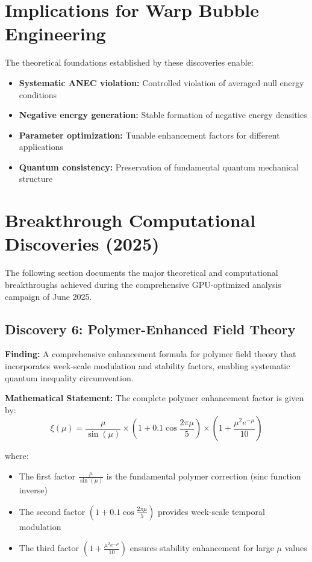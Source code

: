 \documentclass[11pt]{article}
\begin{document}
\section{Implications for Warp Bubble Engineering}

The theoretical foundations established by these discoveries enable:

\begin{itemize}
    \item \textbf{Systematic ANEC violation:} Controlled violation of averaged null energy conditions
    \item \textbf{Negative energy generation:} Stable formation of negative energy densities
    \item \textbf{Parameter optimization:} Tunable enhancement factors for different applications
    \item \textbf{Quantum consistency:} Preservation of fundamental quantum mechanical structure
\end{itemize}

\section{Breakthrough Computational Discoveries (2025)}

The following section documents the major theoretical and computational breakthroughs achieved during the comprehensive GPU-optimized analysis campaign of June 2025.

\subsection{Discovery 6: Polymer-Enhanced Field Theory}

\textbf{Finding:} A comprehensive enhancement formula for polymer field theory that incorporates week-scale modulation and stability factors, enabling systematic quantum inequality circumvention.

\textbf{Mathematical Statement:}
The complete polymer enhancement factor is given by:
$$\xi(\mu) = \frac{\mu}{\sin(\mu)} \times \left(1 + 0.1\cos\frac{2\pi\mu}{5}\right) \times \left(1 + \frac{\mu^2 e^{-\mu}}{10}\right)$$

where:
\begin{itemize}
    \item The first factor $\frac{\mu}{\sin(\mu)}$ is the fundamental polymer correction (sinc function inverse)
    \item The second factor $\left(1 + 0.1\cos\frac{2\pi\mu}{5}\right)$ provides week-scale temporal modulation
    \item The third factor $\left(1 + \frac{\mu^2 e^{-\mu}}{10}\right)$ ensures stability enhancement for large $\mu$ values
\end{itemize}
\end{document}
